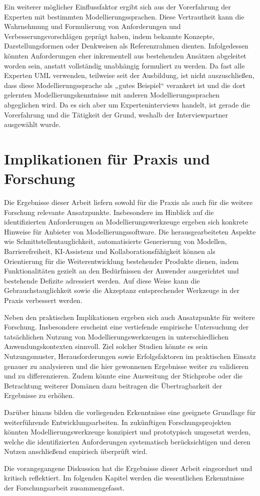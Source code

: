 Ein weiterer möglicher Einflussfaktor ergibt sich aus der Vorerfahrung der Experten mit bestimmten Modellierungssprachen. Diese Vertrautheit kann die Wahrnehmung und Formulierung von Anforderungen und Verbesserungsvorschlägen geprägt haben, indem bekannte Konzepte, Darstellungsformen oder Denkweisen als Referenzrahmen dienten. Infolgedessen könnten Anforderungen eher inkrementell aus bestehenden Ansätzen abgeleitet worden sein, anstatt vollständig unabhängig formuliert zu werden. Da fast alle Experten UML verwenden, teilweise seit der Ausbildung, ist nicht auszuschließen, dass diese Modellierungssprache als „gutes Beispiel“ verankert ist und die dort gelernten Modellierungskenntnisse mit anderen Modellierungssprachen abgeglichen wird.  Da es sich aber um Experteninterviews handelt, ist gerade die Vorerfahrung und die Tätigkeit der Grund, weshalb der Interviewpartner ausgewählt wurde. 

\section{Implikationen für Praxis und Forschung}
Die Ergebnisse dieser Arbeit liefern sowohl für die Praxis als auch für die weitere Forschung relevante Ansatzpunkte. Insbesondere im Hinblick auf die identifizierten Anforderungen an Modellierungswerkzeuge ergeben sich konkrete Hinweise für Anbieter von Modellierungssoftware. Die herausgearbeiteten Aspekte wie Schnittstellentauglichkeit, automatisierte Generierung von Modellen, Barrierefreiheit, KI-Assistenz und Kollaborationsfähigkeit können als Orientierung für die Weiterentwicklung bestehender Produkte dienen, indem Funktionalitäten gezielt an den Bedürfnissen der Anwender ausgerichtet und bestehende Defizite adressiert werden. Auf diese Weise kann die Gebrauchstauglichkeit sowie die Akzeptanz entsprechender Werkzeuge in der Praxis verbessert werden.

Neben den praktischen Implikationen ergeben sich auch Ansatzpunkte für weitere Forschung. Insbesondere erscheint eine vertiefende empirische Untersuchung der tatsächlichen Nutzung von Modellierungswerkzeugen in unterschiedlichen Anwendungskontexten sinnvoll. Ziel solcher Studien könnte es sein Nutzungsmuster, Herausforderungen sowie Erfolgsfaktoren im praktischen Einsatz genauer zu analysieren und die hier gewonnenen Ergebnisse weiter zu validieren und zu differenzieren. Zudem könnte eine Ausweitung der Stichprobe oder die Betrachtung weiterer Domänen dazu beitragen die Übertragbarkeit der Ergebnisse zu erhöhen. 

Darüber hinaus bilden die vorliegenden Erkenntnisse eine geeignete Grundlage für weiterführende Entwicklungsarbeiten. In zukünftigen Forschungsprojekten könnten Modellierungswerkzeuge konzipiert und prototypisch umgesetzt werden, welche die identifizierten Anforderungen systematisch berücksichtigen und deren Nutzen anschließend empirisch überprüft wird. 

Die vorangegangene Diskussion hat die Ergebnisse dieser Arbeit eingeordnet und kritisch reflektiert. Im folgenden Kapitel werden die wesentlichen Erkenntnisse der Forschungsarbeit zusammengefasst.
